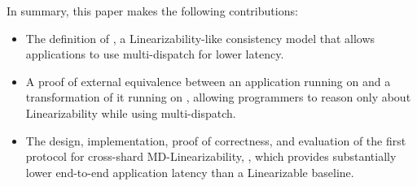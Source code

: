 In summary, this paper makes the following contributions:
\begin{itemize}[leftmargin=*]
\item The definition of \mdl{}, a Linearizability-like consistency model that allows applications to use multi-dispatch for lower latency.
\item A proof of external equivalence between an application running on \sdl{} and a transformation of it running on \mdl{}, allowing programmers to reason only about Linearizability while using multi-dispatch.
\item The design, implementation, proof of correctness, and evaluation of the first protocol for cross-shard MD-Linearizability, \sys{}, which provides substantially lower end-to-end application latency than a Linearizable baseline.
\end{itemize}












